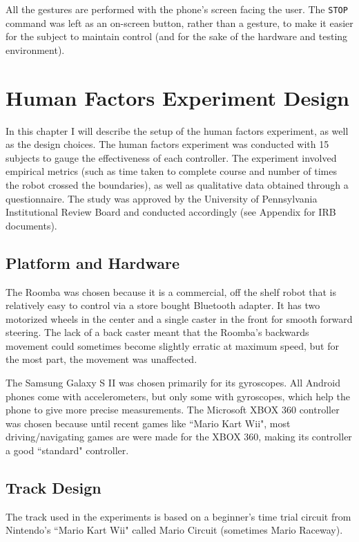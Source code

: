 \documentclass[12pt, letterpaper]{report}
\begin{document}
All the gestures are performed with the phone's screen facing the user. The \texttt{STOP} command was left as an on-screen button, rather than a gesture, to make it easier for the subject to maintain control (and for the sake of the hardware and testing environment).

\chapter{Human Factors Experiment Design}
In this chapter I will describe the setup of the human factors experiment, as well as the design choices. The human factors experiment was conducted with 15 subjects to gauge the effectiveness of each controller. The experiment involved empirical metrics (such as time taken to complete course and number of times the robot crossed the boundaries), as well as qualitative data obtained through a questionnaire. The study was approved by the University of Pennsylvania Institutional Review Board and conducted accordingly (see Appendix for IRB documents).
\section{Platform and Hardware}
The Roomba was chosen because it is a commercial, off the shelf robot that is relatively easy to control via a store bought Bluetooth adapter. It has two motorized wheels in the center and a single caster in the front for smooth forward steering. The lack of a back caster meant that the Roomba's backwards movement could sometimes become slightly erratic at maximum speed, but for the most part, the movement was unaffected.

The Samsung Galaxy S II was chosen primarily for its gyroscopes. All Android phones come with accelerometers, but only some with gyroscopes, which help the phone to give more precise measurements. The Microsoft XBOX 360 controller was chosen because until recent games like ``Mario Kart Wii", most driving/navigating games are were made for the XBOX 360, making its controller a good ``standard" controller.
\section{Track Design}
The track used in the experiments is based on a beginner's time trial circuit from Nintendo's ``Mario Kart Wii" called Mario Circuit (sometimes Mario Raceway). 
\end{document}
